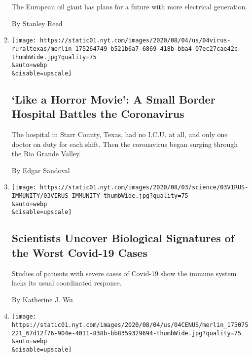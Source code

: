 \begin{enumerate}
  The European oil giant has plans for a future with more electrical
  generation.

  By Stanley Reed
\item
  \href{/2020/08/04/us/texas-coronavirus-rio-grande-valley-starr-county.html}{}

  \texttt{[image: https://static01.nyt.com/images/2020/08/04/us/04virus-ruraltexas/merlin\_175264749\_b521b6a7-6869-418b-bba4-07ec27cae42c-thumbWide.jpg?quality=75\\\&auto=webp\\\&disable=upscale]}

  \hypertarget{like-a-horror-movie-a-small-border-hospital-battles-the-coronavirus}{%
  \subsection{`Like a Horror Movie': A Small Border Hospital Battles the
  Coronavirus}\label{like-a-horror-movie-a-small-border-hospital-battles-the-coronavirus}}

  The hospital in Starr County, Texas, had no I.C.U. at all, and only
  one doctor on duty for each shift. Then the coronavirus began surging
  through the Rio Grande Valley.

  By Edgar Sandoval
\item
  \href{/2020/08/04/health/coronavirus-immune-system.html}{}

  \texttt{[image: https://static01.nyt.com/images/2020/08/03/science/03VIRUS-IMMUNITY/03VIRUS-IMMUNITY-thumbWide.jpg?quality=75\\\&auto=webp\\\&disable=upscale]}

  \hypertarget{scientists-uncover-biological-signatures-of-the-worst-covid-19-cases}{%
  \subsection{Scientists Uncover Biological Signatures of the Worst
  Covid-19
  Cases}\label{scientists-uncover-biological-signatures-of-the-worst-covid-19-cases}}

  Studies of patients with severe cases of Covid-19 show the immune
  system lacks its usual coordinated response.

  By Katherine J. Wu
\item
  \href{/2020/08/04/us/2020-census-ending-early.html}{}

  \texttt{[image: https://static01.nyt.com/images/2020/08/04/us/04CENUS/merlin\_175075221\_67d12f76-904e-4011-838b-bb8359329694-thumbWide.jpg?quality=75\\\&auto=webp\\\&disable=upscale]}

  \hypertarget{after-census-bureau-announces-early-end-to-its-count-fears-of-a-skewed-tally-rise}{%
}
\end{enumerate}

